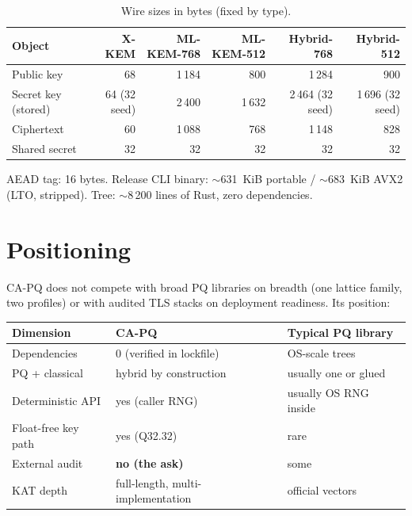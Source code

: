\documentclass[11pt,a4paper]{article}
\begin{document}
\begin{table}[h]
\centering
\caption{Wire sizes in bytes (fixed by type).}
\begin{tabular}{lrrrrr}
\toprule
Object & X-KEM & ML-KEM-768 & ML-KEM-512 & Hybrid-768 & Hybrid-512 \\
\midrule
Public key & 68 & 1\,184 & 800 & 1\,284 & 900 \\
Secret key (stored) & 64 (32 seed) & 2\,400 & 1\,632 & 2\,464 (32 seed) & 1\,696 (32 seed) \\
Ciphertext & 60 & 1\,088 & 768 & 1\,148 & 828 \\
Shared secret & 32 & 32 & 32 & 32 & 32 \\
\bottomrule
\end{tabular}
\end{table}

AEAD tag: 16 bytes. Release CLI binary: $\sim$631~KiB portable / $\sim$683~KiB AVX2
(LTO, stripped). Tree: $\sim$8\,200 lines of Rust, zero dependencies.

\section{Positioning}

CA-PQ does not compete with broad PQ libraries on breadth (one lattice family, two
profiles) or with audited TLS stacks on deployment readiness. Its position:

\begin{table}[h]
\centering
\begin{tabular}{lll}
\toprule
Dimension & CA-PQ & Typical PQ library \\
\midrule
Dependencies & 0 (verified in lockfile) & OS-scale trees \\
PQ + classical & hybrid by construction & usually one or glued \\
Deterministic API & yes (caller RNG) & usually OS RNG inside \\
Float-free key path & yes (Q32.32) & rare \\
External audit & \textbf{no (the ask)} & some \\
KAT depth & full-length, multi-implementation & official vectors \\
\bottomrule
\end{tabular}
\end{table}
\end{document}

